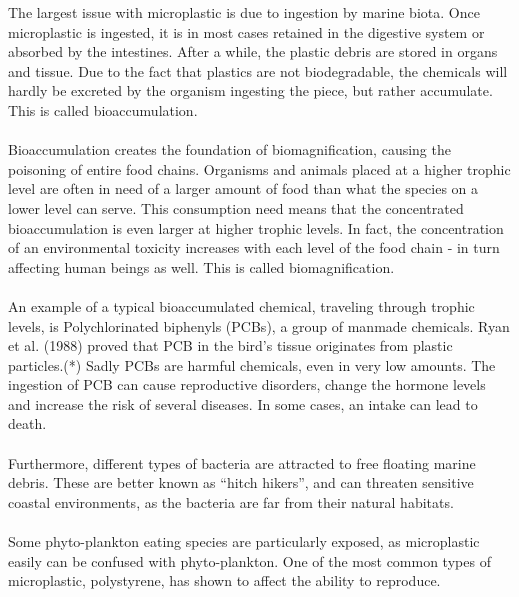 The largest issue with microplastic is due to ingestion by marine biota. Once microplastic is ingested, it is in most cases retained in the digestive system or absorbed by the intestines. After a while, the plastic debris are stored in organs and tissue. Due to the fact that plastics are not biodegradable, the chemicals will hardly be excreted by the organism ingesting the piece, but rather accumulate. This is called bioaccumulation. 
\\\\
Bioaccumulation creates the foundation of biomagnification, causing the poisoning of entire food chains. Organisms and animals placed at a higher trophic level are often in need of a larger amount of food than what the species on a lower level can serve. This consumption need means that the concentrated bioaccumulation is even larger at higher trophic levels. In fact, the concentration of an environmental toxicity increases with each level of the food chain - in turn affecting human beings as well. This is called biomagnification. 
\\\\
An example of a typical bioaccumulated chemical, traveling through trophic levels, is Polychlorinated biphenyls (PCBs), a group of manmade chemicals. Ryan et al. (1988) proved that PCB in the bird's tissue originates from plastic particles.(*) Sadly PCBs are harmful chemicals, even in very low amounts. The ingestion of PCB can cause reproductive disorders, change the hormone levels and increase the risk of several diseases. In some cases, an intake can lead to death. %
\\\\
Furthermore, different types of bacteria are attracted to free floating marine debris. These are better known as “hitch hikers”, and can threaten sensitive coastal environments, as the bacteria are far from their natural habitats. 
\\\\
Some phyto-plankton eating species are particularly exposed, as microplastic easily can be confused with phyto-plankton. One of the most common types of microplastic, polystyrene, has shown to affect the ability to reproduce. %
